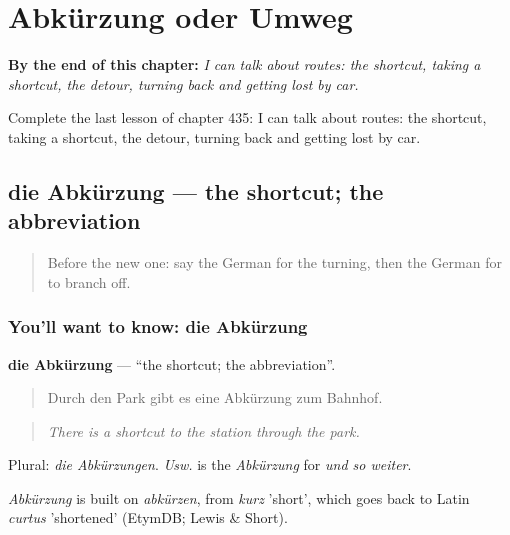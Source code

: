 
\chapter{Abkürzung oder Umweg}
\label{ch:ge-abkurzung-oder-umweg}

\begin{chapteropening}
\textbf{By the end of this chapter:} \emph{I can talk about routes: the shortcut, taking a shortcut, the detour, turning back and getting lost by car.}

Complete the last lesson of chapter 435: I can talk about routes: the shortcut, taking a shortcut, the detour, turning back and getting lost by car.
\end{chapteropening}

\section[die Abkürzung]{die Abkürzung — the shortcut; the abbreviation}

\label{lesson:GE-C435-abkuerzung}



\begin{quote}
Before the new one: say the German for the turning, then the German for to branch off.
\end{quote}

\subsection*{You'll want to know: die Abkürzung}
\textbf{die Abkürzung} — \textquotedblleft{}the shortcut; the abbreviation\textquotedblright{}.

\begin{quote}
Durch den Park gibt es eine Abkürzung zum Bahnhof.
\end{quote}

\begin{quote}
\emph{There is a shortcut to the station through the park.}
\end{quote}

Plural: \emph{die Abkürzungen}. \emph{Usw.} is the \emph{Abkürzung} for \emph{und so weiter}.

\begin{cousinweb}
\emph{Abkürzung} is built on \emph{abkürzen}, from \emph{kurz} 'short', which goes back to Latin \emph{curtus} 'shortened' (EtymDB; Lewis \& Short).
\end{cousinweb}

